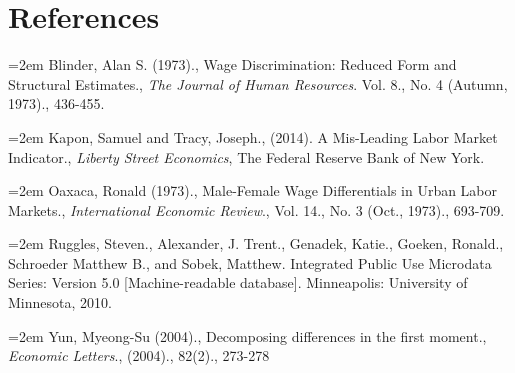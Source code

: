 \documentclass[11pt]{article}
\theoremstyle{definition}
\begin{document}
\newpage
\section*{References}
\hangindent=2em
Blinder, Alan S. (1973)., Wage Discrimination: Reduced Form and Structural Estimates.,  \textit{The Journal of Human Resources}. Vol. 8., No. 4 (Autumn, 1973)., 436-455.

\noindent
\hangindent=2em
Kapon, Samuel and Tracy, Joseph., (2014). A Mis-Leading Labor Market Indicator., \textit{Liberty Street Economics}, The Federal Reserve Bank of New York.

\noindent
\hangindent=2em
Oaxaca, Ronald (1973)., Male-Female Wage Differentials in Urban Labor Markets.,  \textit{International Economic Review}., Vol. 14., No. 3 (Oct., 1973)., 693-709.

\vspace{2mm}
\noindent
\hangindent=2em
Ruggles, Steven., Alexander, J. Trent., Genadek, Katie., Goeken, Ronald., Schroeder Matthew B., and Sobek, Matthew. Integrated Public Use Microdata Series: Version 5.0 [Machine-readable database]. Minneapolis: University of Minnesota, 2010.

\noindent
\hangindent=2em
Yun, Myeong-Su (2004)., Decomposing differences in the first moment., \textit{Economic Letters}., (2004)., 82(2)., 273-278
\end{document}
